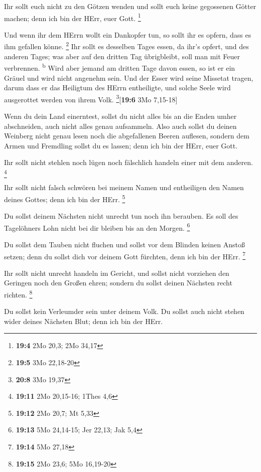  Ihr sollt euch nicht zu den Götzen wenden und sollt euch
keine gegossenen Götter machen; denn ich bin der HErr, euer Gott.
\footnote{\textbf{19:4} 2Mo 20,3; 2Mo 34,17}

 Und wenn ihr dem HErrn wollt ein Dankopfer tun, so sollt
ihr es opfern, dass es ihm gefallen könne. \footnote{\textbf{19:5} 3Mo
  22,18-20}  Ihr sollt es desselben Tages essen, da ihr's
opfert, und des anderen Tages; was aber auf den dritten Tag übrigbleibt,
soll man mit Feuer verbrennen. \textsuperscript{b}  Wird
aber jemand am dritten Tage davon essen, so ist er ein Gräuel und wird
nicht angenehm sein.  Und der Esser wird seine Missetat
tragen, darum dass er das Heiligtum des HErrn entheiligte, und solche
Seele wird ausgerottet werden von ihrem Volk.
\footnote{\textbf{20:8} 3Mo 19,37}{[}\textbf{19:6} 3Mo 7,15-18{]}

 Wenn du dein Land einerntest, sollst du nicht alles bis
an die Enden umher abschneiden, auch nicht alles genau aufsammeln.
 Also auch sollst du deinen Weinberg nicht genau lesen
noch die abgefallenen Beeren auflesen, sondern dem Armen und Fremdling
sollst du es lassen; denn ich bin der HErr, euer Gott.

 Ihr sollt nicht stehlen noch lügen noch fälschlich
handeln einer mit dem anderen. \footnote{\textbf{19:11} 2Mo 20,15-16;
  1Thes 4,6}

 Ihr sollt nicht falsch schwören bei meinem Namen und
entheiligen den Namen deines Gottes; denn ich bin der HErr. \footnote{\textbf{19:12}
  2Mo 20,7; Mt 5,33}

 Du sollst deinem Nächsten nicht unrecht tun noch ihn
berauben. Es soll des Tagelöhners Lohn nicht bei dir bleiben bis an den
Morgen. \footnote{\textbf{19:13} 5Mo 24,14-15; Jer 22,13; Jak 5,4}

 Du sollst dem Tauben nicht fluchen und sollst vor dem
Blinden keinen Anstoß setzen; denn du sollst dich vor deinem Gott
fürchten, denn ich bin der HErr. \footnote{\textbf{19:14} 5Mo 27,18}

 Ihr sollt nicht unrecht handeln im Gericht, und sollst
nicht vorziehen den Geringen noch den Großen ehren; sondern du sollst
deinen Nächsten recht richten. \footnote{\textbf{19:15} 2Mo 23,6; 5Mo
  16,19-20}

 Du sollst kein Verleumder sein unter deinem Volk. Du
sollst auch nicht stehen wider deines Nächsten Blut; denn ich bin der
HErr.

